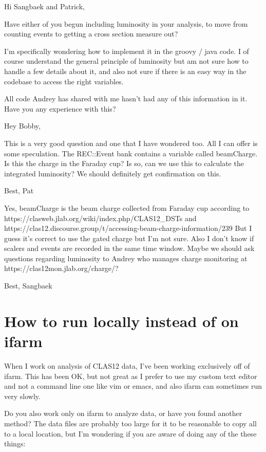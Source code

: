     
    Hi Sangbaek and Patrick,



    Have either of you begun including luminosity in your analysis, to move from counting events to getting a cross section measure out?
    
    
    
    I'm specifically wondering how to implement it in the groovy / java code. I of course understand the general principle of luminosity but am not sure how to handle a few details about it, and also not sure if there is an easy way in the codebase to access the right variables.
    
    
    
    All code Andrey has shared with me hasn't had any of this information in it. Have you any experience with this?
        
        
    Hey Bobby,

    This is a very good question and one that I have wondered too. All I can offer is some speculation. The REC::Event bank contains a variable called beamCharge. Is this the charge in the Faraday cup? Is so, can we use this to calculate the integrated luminosity? We should definitely get confirmation on this.
    
    Best,
    Pat
    
    
    Yes, beamCharge is the beam charge collected from Faraday cup according to https://clasweb.jlab.org/wiki/index.php/CLAS12_DSTs  and https://clas12.discourse.group/t/accessing-beam-charge-information/239
    But I guess it's correct to use the gated charge but I'm not sure.
    Also I don't know if scalers and events are recorded in the same time window.  Maybe we should ask questions regarding luminosity to Andrey who manages charge monitoring at https://clas12mon.jlab.org/charge/?
    
    Best,
    Sangbaek
        
    
\section{How to run locally instead of on ifarm}

    When I work on analysis of CLAS12 data, I've been working exclusively off of ifarm. This has been OK, but not great as I prefer to use my custom text editor and not a command line one like vim or emacs, and also ifarm can sometimes run very slowly.
    
    Do you also work only on ifarm to analyze data, or have you found another method? The data files are probably too large for it to be reasonable to copy all to a local location, but I'm wondering if you are aware of doing any of the these things:
    
